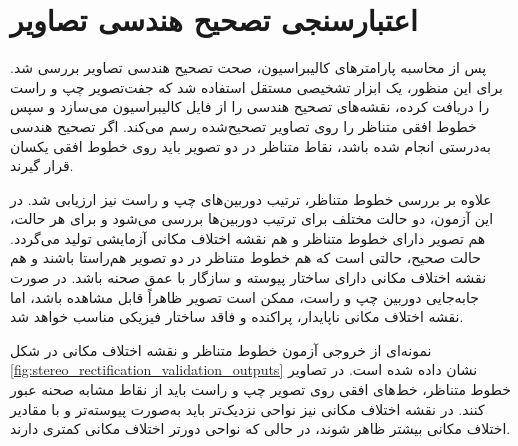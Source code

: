 \section{اعتبارسنجی تصحیح هندسی تصاویر}
\label{app:stereo_rectification_validation}

پس از محاسبه پارامترهای کالیبراسیون، صحت تصحیح هندسی تصاویر بررسی شد. برای این منظور، یک ابزار تشخیصی مستقل استفاده شد که جفت‌تصویر چپ و راست را دریافت کرده، نقشه‌های تصحیح هندسی را از فایل کالیبراسیون می‌سازد و سپس خطوط افقی متناظر را روی تصاویر تصحیح‌شده رسم می‌کند. اگر تصحیح هندسی به‌درستی انجام شده باشد، نقاط متناظر در دو تصویر باید روی خطوط افقی یکسان قرار گیرند.

علاوه بر بررسی خطوط متناظر، ترتیب دوربین‌های چپ و راست نیز ارزیابی شد. در این آزمون، دو حالت مختلف برای ترتیب دوربین‌ها بررسی می‌شود و برای هر حالت، هم تصویر دارای خطوط متناظر و هم نقشه اختلاف مکانی آزمایشی تولید می‌گردد. حالت صحیح، حالتی است که هم خطوط متناظر در دو تصویر هم‌راستا باشند و هم نقشه اختلاف مکانی دارای ساختار پیوسته و سازگار با عمق صحنه باشد. در صورت جابه‌جایی دوربین چپ و راست، ممکن است تصویر ظاهراً قابل مشاهده باشد، اما نقشه اختلاف مکانی ناپایدار، پراکنده و فاقد ساختار فیزیکی مناسب خواهد شد.

نمونه‌ای از خروجی آزمون خطوط متناظر و نقشه اختلاف مکانی در شکل \ref{fig:stereo_rectification_validation_outputs} نشان داده شده است. در تصاویر خطوط متناظر، خط‌های افقی روی تصویر چپ و راست باید از نقاط مشابه صحنه عبور کنند. در نقشه اختلاف مکانی نیز نواحی نزدیک‌تر باید به‌صورت پیوسته‌تر و با مقادیر اختلاف مکانی بیشتر ظاهر شوند، در حالی که نواحی دورتر اختلاف مکانی کمتری دارند.

